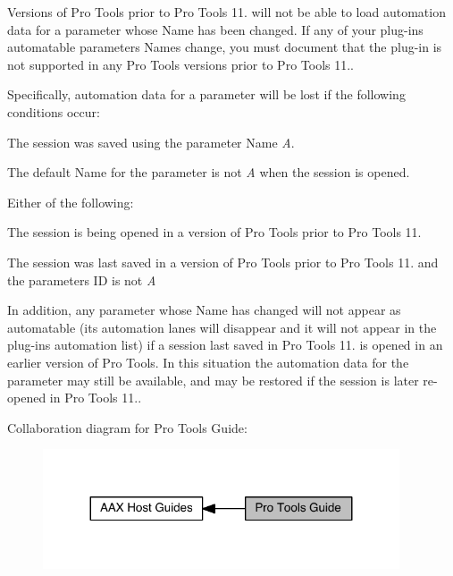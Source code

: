 Versions of Pro Tools prior to Pro Tools 11. will not be able to load automation data for a parameter whose Name has been changed. If any of your plug-\/in\textquotesingle{}s automatable parameters\textquotesingle{} Names change, you must document that the plug-\/in is not supported in any Pro Tools versions prior to Pro Tools 11..

Specifically, automation data for a parameter will be lost if the following conditions occur\+: 
\begin{DoxyItemize}
\item The session was saved using the parameter Name {\itshape A}.  
\item The default Name for the parameter is not {\itshape A} when the session is opened.  
\item Either of the following\+: 
\begin{DoxyItemize}
\item The session is being opened in a version of Pro Tools prior to Pro Tools 11.  
\item The session was last saved in a version of Pro Tools prior to Pro Tools 11. and the parameter\textquotesingle{}s I\+D is not {\itshape A}  
\end{DoxyItemize}
\end{DoxyItemize}

In addition, any parameter whose Name has changed will not appear as automatable (its automation lanes will disappear and it will not appear in the plug-\/in\textquotesingle{}s automation list) if a session last saved in Pro Tools 11. is opened in an earlier version of Pro Tools. In this situation the automation data for the parameter may still be available, and may be restored if the session is later re-\/opened in Pro Tools 11..

Collaboration diagram for Pro Tools Guide\+:
\nopagebreak
\begin{figure}[H]
\begin{center}
\leavevmode
\includegraphics[width=299pt]{a00360}
\end{center}
\end{figure}
